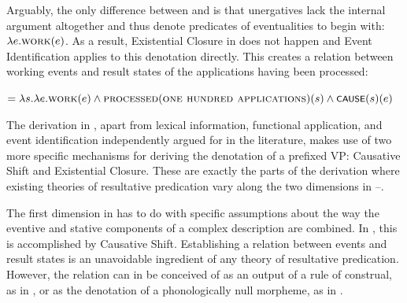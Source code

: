 \documentclass[output=paper,colorlinks,citecolor=brown]{langscibook}
\begin{document}
\ea\label{ex:tatevosov:88}
\z
\z

\noindent Arguably, the only difference between  and  is that unergatives lack the internal argument altogether and thus denote predicates of eventualities to begin with: $\lambda e.\textsc{work}(e)$. As a result, Existential Closure in  does not happen and Event Identification applies to this denotation directly. This creates a relation between working events and result states of the applications having been processed:

\ea   {} $= \lambda s.\lambda e. \textsc{work}(e) \wedge \textsc{processed}(\textsc{one hundred applications})(s) \wedge \cnst{cause}(s)(e)$\label{ex:tatevosov:89}
\z

\noindent The derivation in , apart from lexical information, functional application, and event identification independently argued for in the literature, makes use of two more specific mechanisms for deriving the denotation of a prefixed VP: Causative Shift and Existential Closure. These are exactly the parts of the derivation where existing theories of resultative predication vary along the two dimensions in --.

\newpage
The first dimension in  has to do with specific assumptions about the way the eventive and stative components of a complex description are combined. In , this is accomplished by Causative Shift. Establishing a relation between events and result states is an unavoidable ingredient of any theory of resultative predication. However, the relation can in be conceived of as an output of a rule of construal, as in , or as the denotation of a phonologically null morpheme, as in .
\end{document}

